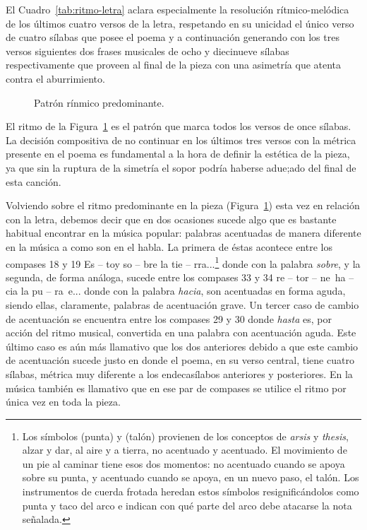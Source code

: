El Cuadro~\ref{tab:ritmo-letra} aclara especialmente la resolución rítmico-melódica de los últimos cuatro versos de la letra, respetando en su unicidad el único verso de cuatro sílabas que posee el poema y a continuación generando con los tres versos siguientes dos frases musicales de ocho y diecinueve sílabas respectivamente que proveen al final de la pieza con una asimetría que atenta contra el aburrimiento.

\begin{figure}[H]
\centering
{}
\caption{Patrón rínmico predominante.}
\label{fig:patron-ritmico}
\end{figure}

El ritmo de la Figura~\ref{fig:patron-ritmico} es el patrón que marca todos los versos de once sílabas. La decisión compositiva de no continuar en los últimos tres versos con la métrica presente en el poema es fundamental a la hora de definir la estética de la pieza, ya que sin la ruptura de la simetría el sopor podría haberse adue;ado del final de esta canción.

Volviendo sobre el ritmo predominante en la pieza (Figura~\ref{fig:patron-ritmico}) esta vez en relación con la letra, debemos decir que en dos ocasiones sucede algo que es bastante habitual encontrar en la música popular: palabras acentuadas de manera diferente en la música a como son en el habla. La primera de éstas acontece entre los compases 18 y 19  {Es -- toy so -- bre la tie -- rra...}\footnote{Los símbolos  (punta) y  (talón) provienen de los conceptos de \emph{arsis} y \emph{thesis}, alzar y dar, al aire y a tierra, no acentuado y acentuado. El movimiento de un pie al caminar tiene esos dos momentos: no acentuado cuando se apoya sobre su punta, y acentuado cuando se apoya, en un nuevo paso, el talón. Los instrumentos de cuerda frotada heredan estos símbolos resignificándolos como punta y taco del arco e indican con qué parte del arco debe atacarse la nota señalada.} donde con la palabra \emph{sobre}, y la segunda, de forma análoga, sucede entre los compases 33 y 34  {re -- tor -- ne~ha -- cia la pu -- ra~e...} donde con la palabra \emph{hacia}, son acentuadas en forma aguda, siendo ellas, claramente, palabras de acentuación grave. Un tercer caso de cambio de acentuación se encuentra entre los compases 29 y 30  donde \emph{hasta} es, por acción del ritmo musical, convertida en una palabra con acentuación aguda. Este último caso es aún más llamativo que los dos anteriores debido a que este cambio de acentuación sucede justo en donde el poema, en su verso central, tiene cuatro sílabas, métrica muy diferente a los endecasílabos anteriores y posteriores. En la música también es llamativo que en ese par de compases se utilice el ritmo  por única vez en toda la pieza.

